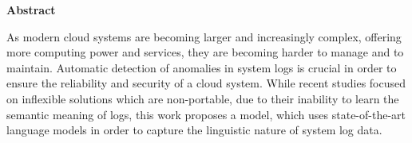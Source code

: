 \thispagestyle{empty}
\vspace*{1.0cm}

\begin{center}
    \textbf{Abstract}
\end{center}

\vspace*{0.5cm}

\noindent
As modern cloud systems are becoming larger and increasingly complex, offering more computing power and services, they are becoming harder to manage and to maintain. Automatic detection of anomalies in system logs is crucial in order to ensure the reliability and security of a cloud system. While recent studies focused on inflexible solutions which are non-portable, due to their inability to learn the semantic meaning of logs, this work proposes a model, which uses state-of-the-art language models in order to capture the linguistic nature of system log data.